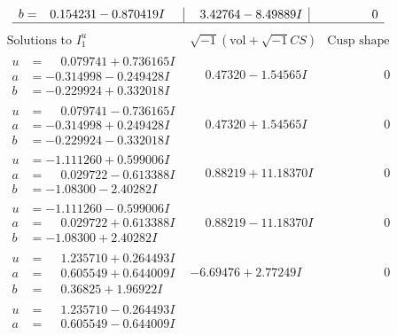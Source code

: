 \documentclass[1p]{elsarticle_modified}
\theoremstyle{definition}
\newcommand{\I}{\sqrt{-1}}
\begin{document}
$$\begin{array}{c|c|c}
\begin{aligned}
b &= \phantom{-}0.154231 - 0.870419 I\end{aligned}
 & \phantom{-}3.42764 - 8.49889 I & \phantom{-0.000000 } 0\\
 \hline 
 \end{array}$$\newpage$$\begin{array}{c|c|c}  
\text{Solutions to }I^u_{1}& \I (\text{vol} + \sqrt{-1}CS) & \text{Cusp shape}\\
 \hline 
\begin{aligned}
u &= \phantom{-}0.079741 + 0.736165 I \\
a &= -0.314998 - 0.249428 I \\
b &= -0.229924 + 0.332018 I\end{aligned}
 & \phantom{-}0.47320 - 1.54565 I & \phantom{-0.000000 } 0 \\ \hline\begin{aligned}
u &= \phantom{-}0.079741 - 0.736165 I \\
a &= -0.314998 + 0.249428 I \\
b &= -0.229924 - 0.332018 I\end{aligned}
 & \phantom{-}0.47320 + 1.54565 I & \phantom{-0.000000 } 0 \\ \hline\begin{aligned}
u &= -1.111260 + 0.599006 I \\
a &= \phantom{-}0.029722 - 0.613388 I \\
b &= -1.08300 - 2.40282 I\end{aligned}
 & \phantom{-}0.88219 + 11.18370 I & \phantom{-0.000000 } 0 \\ \hline\begin{aligned}
u &= -1.111260 - 0.599006 I \\
a &= \phantom{-}0.029722 + 0.613388 I \\
b &= -1.08300 + 2.40282 I\end{aligned}
 & \phantom{-}0.88219 - 11.18370 I & \phantom{-0.000000 } 0 \\ \hline\begin{aligned}
u &= \phantom{-}1.235710 + 0.264493 I \\
a &= \phantom{-}0.605549 + 0.644009 I \\
b &= \phantom{-}0.36825 + 1.96922 I\end{aligned}
 & -6.69476 + 2.77249 I & \phantom{-0.000000 } 0 \\ \hline\begin{aligned}
u &= \phantom{-}1.235710 - 0.264493 I \\
a &= \phantom{-}0.605549 - 0.644009 I \\

\end{aligned}
\end{array}$$
\end{document}
